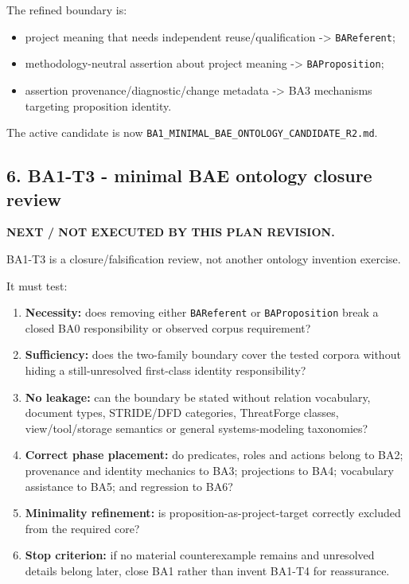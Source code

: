 \documentclass[
  10pt,
]{article}
\providecommand{\tightlist}{%
  \setlength{\itemsep}{0pt}\setlength{\parskip}{0pt}}
\begin{document}
The refined boundary is:

\begin{itemize}
\tightlist
\item
  project meaning that needs independent reuse/qualification
  -\textgreater{} \texttt{BAReferent};
\item
  methodology-neutral assertion about project meaning -\textgreater{}
  \texttt{BAProposition};
\item
  assertion provenance/diagnostic/change metadata -\textgreater{} BA3
  mechanisms targeting proposition identity.
\end{itemize}

The active candidate is now
\texttt{BA1\_MINIMAL\_BAE\_ONTOLOGY\_CANDIDATE\_R2.md}.

\subsection{6. BA1-T3 - minimal BAE ontology closure
review}\label{ba1-t3---minimal-bae-ontology-closure-review}

\textbf{NEXT / NOT EXECUTED BY THIS PLAN REVISION.}

BA1-T3 is a closure/falsification review, not another ontology invention
exercise.

It must test:

\begin{enumerate}
\def\labelenumi{\arabic{enumi}.}
\tightlist
\item
  \textbf{Necessity:} does removing either \texttt{BAReferent} or
  \texttt{BAProposition} break a closed BA0 responsibility or observed
  corpus requirement?
\item
  \textbf{Sufficiency:} does the two-family boundary cover the tested
  corpora without hiding a still-unresolved first-class identity
  responsibility?
\item
  \textbf{No leakage:} can the boundary be stated without relation
  vocabulary, document types, STRIDE/DFD categories, ThreatForge
  classes, view/tool/storage semantics or general systems-modeling
  taxonomies?
\item
  \textbf{Correct phase placement:} do predicates, roles and actions
  belong to BA2; provenance and identity mechanics to BA3; projections
  to BA4; vocabulary assistance to BA5; and regression to BA6?
\item
  \textbf{Minimality refinement:} is proposition-as-project-target
  correctly excluded from the required core?
\item
  \textbf{Stop criterion:} if no material counterexample remains and
  unresolved details belong later, close BA1 rather than invent BA1-T4
  for reassurance.
\end{enumerate}
\end{document}
